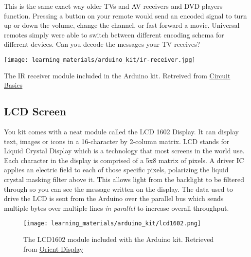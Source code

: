     This is the same exact way older TVs and AV receivers and DVD players function. 
    Pressing a button on your remote would send an encoded signal to turn up or down the volume, change the channel, or fast forward a movie.
    Universal remotes simply were able to switch between different encoding schema for different devices.
    Can you decode the messages your TV receives?

    \begin{marginfigure}[-2.5in]
        \texttt{[image: learning\_materials/arduino\_kit/ir-receiver.jpg]}
        \caption[IR Receiver]{The IR receiver module included in the Arduino kit. 
        Retreived from \href{https://www.circuitbasics.com/arduino-ir-remote-receiver-tutorial/}
        {Circuit Basics}}
    \end{marginfigure}

    \subsection*{LCD Screen}
    You kit comes with a neat module called the LCD 1602 Display.
    It can display text, images or icons in a 16-character by 2-column matrix.
    LCD stands for Liquid Crystal Display which is a technology that most screens in the world use. 
    Each character in the display is comprised of a 5x8 matrix of pixels.
    A driver IC applies an electric field to each of those specific pixels, polarizing the liquid crystal masking filter above it.
    This allows light from the backlight to be filtered through so you can see the message written on the display.
    The data used to drive the LCD is sent from the Arduino over the parallel bus which sends multiple bytes over multiple lines \textit{in parallel} to increase overall throughput.

    \begin{figure}[h!]
        \texttt{[image: learning\_materials/arduino\_kit/lcd1602.png]}
        \caption[LCD Module]{The LCD1602 module included with the Arduino kit. 
        Retrieved from \href{https://www.orientdisplay.com/wp-content/uploads/2020/08/AMC1602AR-B-B6WTDW-I2C-1.jpg}
        {Orient Display}}
    \end{figure}

